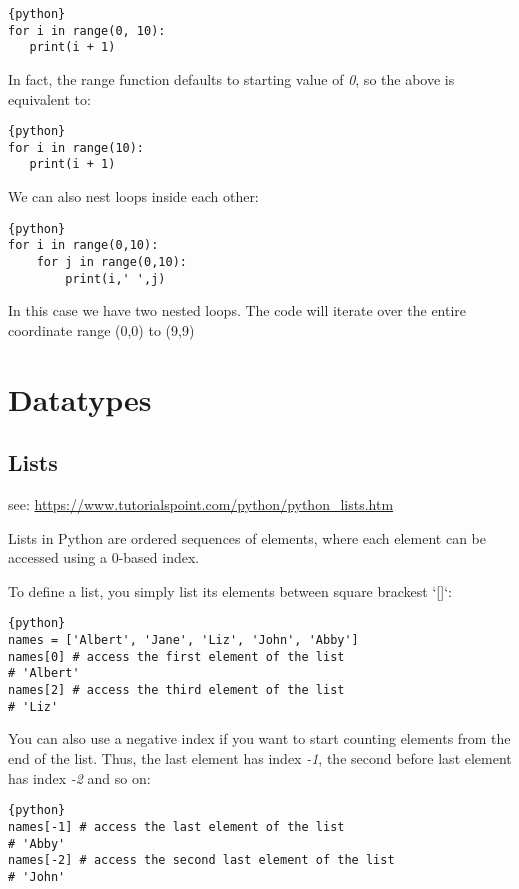 \begin{lstlisting}{python}
for i in range(0, 10):
   print(i + 1)
\end{lstlisting}

In fact, the range function defaults to starting value of \emph{0}, so
the above is equivalent to:

\begin{lstlisting}{python}
for i in range(10):
   print(i + 1)
\end{lstlisting}

We can also nest loops inside each other:

\begin{lstlisting}{python}
for i in range(0,10):
    for j in range(0,10):
        print(i,' ',j)
\end{lstlisting}

In this case we have two nested loops. The code will iterate over the
entire coordinate range (0,0) to (9,9)

\section{Datatypes}\label{datatypes}

\subsection{Lists}\label{lists}

see: \url{https://www.tutorialspoint.com/python/python_lists.htm}

Lists in Python are ordered sequences of elements, where each element
can be accessed using a 0-based index.

To define a list, you simply list its elements between square brackest
`{[}{]}`:

\begin{lstlisting}{python}
names = ['Albert', 'Jane', 'Liz', 'John', 'Abby']
names[0] # access the first element of the list
# 'Albert'
names[2] # access the third element of the list
# 'Liz'
\end{lstlisting}

You can also use a negative index if you want to start counting elements
from the end of the list. Thus, the last element has index \emph{-1},
the second before last element has index \emph{-2} and so on:

\begin{lstlisting}{python}
names[-1] # access the last element of the list
# 'Abby'
names[-2] # access the second last element of the list
# 'John'
\end{lstlisting}

